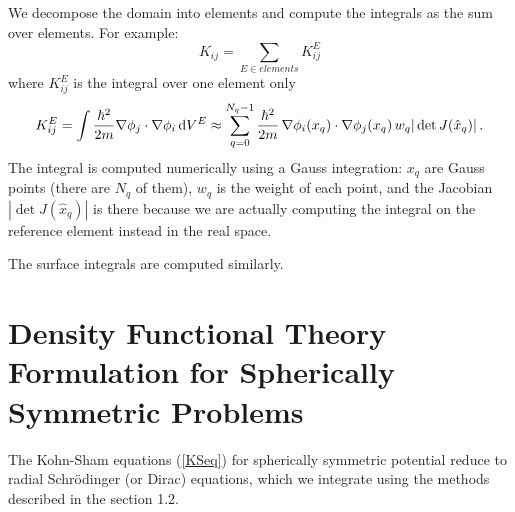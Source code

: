 We decompose the domain into elements and compute the integrals as the sum over elements. For example: 
\begin{equation*}
  K_{ij}=\sum_{E\in elements} K_{ij}^E
\end{equation*}
where $K_{ij}^E$ is the integral over one element only 
\begin{equation*}
  K_{ij}^{E}=\int{\hbar^2\over2m}\nabla\phi_j\cdot\nabla\phi_i\,{\rm d} V^{E}\approx \sum_{q=0}^{N_q-1}{\hbar^2\over2m}\,\nabla\phi_i(x_q)\cdot\nabla\phi_j(x_q)\, w_q|\det J(\hat x_q)|\,.
\end{equation*}
The integral is computed numerically using a Gauss integration: $x_q$ are Gauss points (there are $N_q$ of them), $w_q$ is the weight of each point, and the Jacobian $|\det J(\hat x_q)|$ is there because we are actually computing the integral on the reference element instead in the real space.

The surface integrals are computed similarly.


\section{Density Functional Theory Formulation for Spherically Symmetric
Problems}

The Kohn-Sham equations (\ref{KSeq}) for spherically symmetric potential reduce
to radial Schr\"odinger (or Dirac) equations, which we integrate using the
methods described in the section 1.2.
